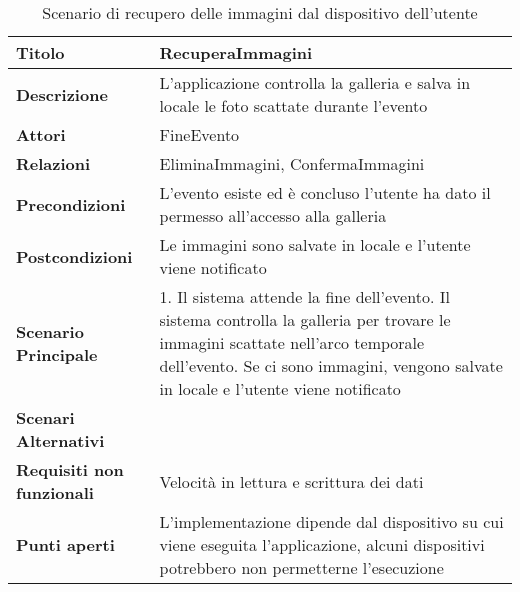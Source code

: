 \begin{table}[htb]
    \begin{tabular} {|P{4.5cm}|P{11cm}|}
        \hline
        \textbf{Titolo}                   & RecuperaImmagini                                                                                                                           \\
        \hline
        \textbf{Descrizione}              & L'applicazione controlla la galleria e salva in locale le foto scattate durante l'evento                                                   \\
        \hline
        \textbf{Attori}                   & FineEvento                                                                                                                                 \\
        \hline
        \textbf{Relazioni}                & EliminaImmagini, ConfermaImmagini                                                                                                          \\
        \hline
        \textbf{Precondizioni}            & L'evento esiste ed è concluso\linebreak
        l'utente ha dato il permesso all'accesso alla galleria                                                                                                                         \\
        \hline
        \textbf{Postcondizioni}           & Le immagini sono salvate in locale e l'utente viene notificato                                                                             \\
        \hline
        \textbf{Scenario Principale}      & 1. Il sistema attende la fine dell'evento. Il sistema controlla la galleria per trovare le immagini scattate nell'arco temporale dell'evento. Se ci sono immagini, vengono salvate in locale e l'utente viene notificato                                                                                                  \\
        \hline
        \textbf{Scenari Alternativi}      &                                                                                                                                            \\
        \hline
        \textbf{Requisiti non funzionali} & Velocità in lettura e scrittura dei dati                                                                                                   \\
        \hline
        \textbf{Punti aperti}             & L'implementazione dipende dal dispositivo su cui viene eseguita l'applicazione, alcuni dispositivi potrebbero non permetterne l'esecuzione \\
        \hline
    \end{tabular}


    \caption{Scenario di recupero delle immagini dal dispositivo dell'utente}
\end{table}

